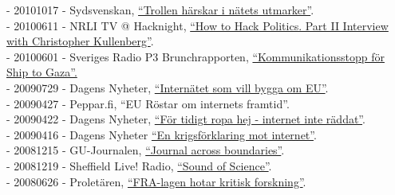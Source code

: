 \documentclass[a4paper,11pt,oneside]{article}
\begin{document}
    - 20101017 - Sydsvenskan, \href{http://www.sydsvenskan.se/2010-10-17/trollen-harskar-i-natets-utmarker}{``Trollen härskar i nätets utmarker''}. \\
    - 20100611 - NRLI TV @ Hacknight, \href{http://www.youtube.com/watch?v=VhmH6cJZS4k&amp;feature=related}{``How to Hack Politics. Part II Interview with Christopher Kullenberg''}. \\
    - 20100601 - Sveriges Radio P3 Brunchrapporten, \href{http://t.sr.se/1cnEijY}{``Kommunikationsstopp för Ship to Gaza''.} \\
    - 20090729 - Dagens Nyheter, \href{http://www.dn.se/kultur-noje/nyheter/internatet-som-vill-bygga-om-eu/}{``Internätet som vill bygga om EU''}. \\
    - 20090427 - Peppar.fi, ``EU Röstar om internets framtid''. \\
    - 20090422 - Dagens Nyheter, \href{http://www.dn.se/kultur-noje/musik/for-tidigt-ropa-hej-internet-inte-raddat/}{``För tidigt ropa hej - internet inte räddat''}. \\
    - 20090416 - Dagens Nyheter \href{http://www.dn.se/kultur-noje/en-krigsforklaring-mot-internet/}{``En krigsförklaring mot internet''}. \\
    - 20081215 - GU-Journalen, \href{http://www.gu-journalen.gu.se/english/News/News_detail/?contentId=855527}{``Journal across boundaries''}. \\
    - 20081219 - Sheffield Live! Radio, \href{http://www.dcs.shef.ac.uk/%7Enoel/soundofscience/Prog%2032.mp3}{``Sound of Science''}. \\
    - 20080626 - Proletären, \href{http://www.proletaren.se/inrikes/%E2%80%9Dfra-lagen-hotar-kritisk-forskning}{``FRA-lagen hotar kritisk forskning''}.
\end{document}
